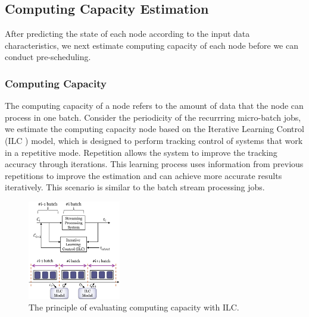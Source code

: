 \subsection{Computing Capacity Estimation}

After predicting the state of each node according to the input data
characteristics, we next estimate computing capacity of each node before we can
conduct pre-scheduling.

\subsubsection{Computing Capacity}


The computing capacity of a node refers to the amount of data that the node can
process in one batch. 
Consider the periodicity of the recurrring micro-batch jobs, we estimate
the computing capacity node based on the Iterative
Learning Control (ILC \cite{Arimoto}) model, which is designed to perform tracking control
of systems that work in a repetitive mode. Repetition allows the system to
improve the tracking accuracy through iterations. This learning process
uses information from previous repetitions to improve the estimation and can
achieve more accurate results iteratively. This scenario
is similar to the batch stream processing jobs.  

\begin{figure}[htbp] \centering
  \includegraphics[width=0.36\textwidth]{FigureILC} \caption{The principle of
  evaluating computing capacity with ILC.} \label{Fig. 7:} \end{figure}

